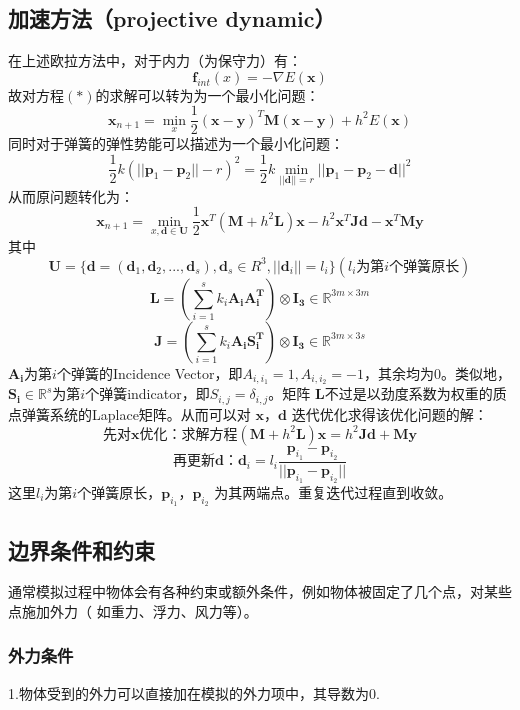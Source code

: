 \documentclass{article}
\begin{document}
	
	\subsection{加速方法（projective dynamic）}
	在上述欧拉方法中，对于内力（为保守力）有：
	$$\boldsymbol f_{int}(x)=-\nabla E(\boldsymbol x)$$
	故对方程$(*)$的求解可以转为为一个最小化问题：
	$$\boldsymbol x_{n+1}=\min\limits_{x}\frac{1}{2}(\boldsymbol x-\boldsymbol 
	y)^T\boldsymbol M(\boldsymbol x-\boldsymbol y)+h^2E(\boldsymbol x)$$
	同时对于弹簧的弹性势能可以描述为一个最小化问题：
	$$\frac{1}{2}k(||\boldsymbol p_1-\boldsymbol p_2||-r)^2=\frac{1}{2}k 
	\min\limits_{||\boldsymbol d||=r}||\boldsymbol p_1-\boldsymbol 
	p_2-\boldsymbol d||^2$$
	从而原问题转化为：
	$$\boldsymbol x_{n+1}=\min\limits_{x,\boldsymbol d\in\boldsymbol 
	U}\frac{1}{2}\boldsymbol x^T(\boldsymbol M+h^2\boldsymbol L)\boldsymbol 
	x-h^2\boldsymbol x^T\boldsymbol J \boldsymbol d-\boldsymbol x^T \boldsymbol 
	M \boldsymbol y	$$
	其中$$\boldsymbol U= \{ \boldsymbol d=(\boldsymbol d_1,\boldsymbol 
	d_2,...,\boldsymbol d_s),\boldsymbol d_s\in R^3,||\boldsymbol d_i||=l_i \} 
	(\mbox{$l_i$为第$i$个弹簧原长})$$
	$$\boldsymbol L=\left(\sum_{i=1}^{s}k_i\boldsymbol{A_i}\boldsymbol{A_i^T}
	\right)\otimes\boldsymbol{I_3}\in \mathbb{R}^{3m\times 3m}$$
	$$\boldsymbol J=\left(\sum_{i=1}^{s}k_i\boldsymbol{A_i}\boldsymbol{S_i^T}
	\right)\otimes\boldsymbol{I_3}\in \mathbb{R}^{3m\times 3s}$$
	$\boldsymbol{A_i}$为第$i$个弹簧的Incidence 
	Vector，即$A_{i,i_1}=1,A_{i,i_2}=-1$，其余均为0。类似地，$\boldsymbol{S_i}\in
	\mathbb{R}^{s}$为第$i$个弹簧indicator，即$S_{i,j}=\delta_{i,j}$。矩阵
	$\boldsymbol{L}$不过是以劲度系数为权重的质点弹簧系统的Laplace矩阵。从而可以对 
	$\boldsymbol x$，$\boldsymbol d$ 迭代优化求得该优化问题的解：
	$$\mbox{先对$\boldsymbol{x}$优化：求解方程}
	(\boldsymbol{M}+h^2\boldsymbol {L})\boldsymbol{x}=h^2\boldsymbol{J} 
	\boldsymbol{d}+\boldsymbol{M}\boldsymbol{y}$$
	$$\mbox{再更新$\boldsymbol{d}$：}
	\boldsymbol d_i=l_i\frac{\boldsymbol p_{i_1}-\boldsymbol 
	p_{i_2}}{||\boldsymbol p_{i_1}-\boldsymbol p_{i_2}||}$$
	这里$l_i$为第$i$个弹簧原长，$\boldsymbol p_{i_1}，\boldsymbol p_{i_2}$
	为其两端点。重复迭代过程直到收敛。
	\subsection{边界条件和约束}
	通常模拟过程中物体会有各种约束或额外条件，例如物体被固定了几个点，对某些点施加外力（
	如重力、浮力、风力等）。
	\subsubsection{外力条件}
	1.物体受到的外力可以直接加在模拟的外力项中，其导数为0.
	
\end{document}
